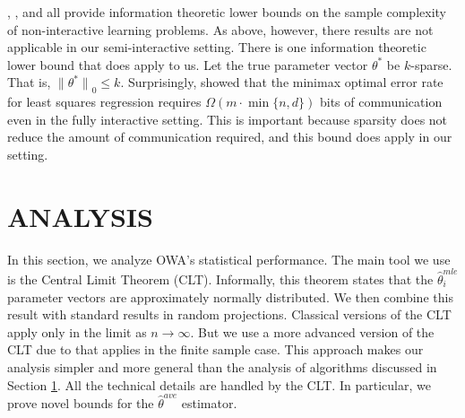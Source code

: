 \documentclass[twoside]{article}
\newcommand{\w}{\theta}
\newcommand{\wave}{\hat\w^{ave}}
\newcommand{\wmle}{\hat\w^{mle}}
\newcommand{\wstar}{{\w^{*}}}
\newcommand{\lzero}[1]{{\lVert {#1} \rVert}_0}
\begin{document}
\cite{shamir2014fundamental}, \cite{zhang2013information}, and \cite{garg2014communication} all provide information theoretic lower bounds on the sample complexity of non-interactive learning problems.
As above, however, there results are not applicable in our semi-interactive setting.
There is one information theoretic lower bound that does apply to us.
Let the true parameter vector $\wstar$ be $k$-sparse.
That is, $\lzero{\wstar} \le k$.
Surprisingly, \cite{braverman2015communication} showed that the minimax optimal error rate for least squares regression requires $\Omega(m\cdot\min\{n,d\})$ bits of communication even in the fully interactive setting.
This is important because sparsity does not reduce the amount of communication required, and this bound does apply in our setting.

\section{ANALYSIS}
\label{sec:anal}

In this section, we analyze OWA's statistical performance.
The main tool we use is the Central Limit Theorem (CLT).
Informally, this theorem states that the $\wmle_i$ parameter vectors are approximately normally distributed.
We then combine this result with standard results in random projections.
Classical versions of the CLT apply only in the limit as $n\to\infty$.
But we use a more advanced version of the CLT due to \cite{spokoiny2012parametricestimation} that applies in the finite sample case.
This approach makes our analysis simpler and more general than the analysis of algorithms discussed in Section \ref{sec:anal}.
All the technical details are handled by the CLT.
In particular, we prove novel bounds for the $\wave$ estimator.
\end{document}
